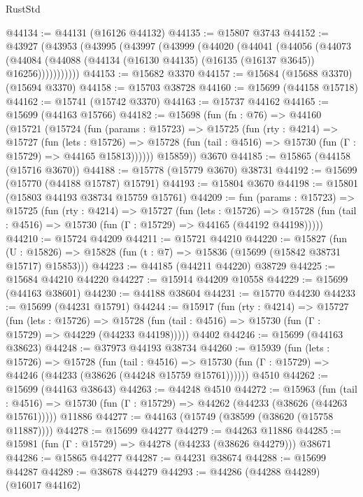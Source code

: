 \begin{lexlean}{RustStd}
\begin{coremodule}
@44134 := @44131 (@16126 @44132)
@44135 := @15807 @3743
@44152 := @43927
    (@43953
      (@43995
        (@43997
          (@43999
            (@44020
              (@44041
                (@44056
                  (@44073
                    (@44084
                      (@44088 (@44134 (@16130 @44135) (@16135 (@16137 @3645)) @16256)))))))))))
@44153 := @15682 @3370
@44157 := @15684 (@15688 @3370) (@15694 @3370)
@44158 := @15703 @38728
@44160 := @15699 (@44158 @15718)
@44162 := @15741 (@15742 @3370)
@44163 := @15737 @44162
@44165 := @15699 (@44163 @15766)
@44182 := @15698
    (fun (fn : @76) =>
    @44160
      (@15721
        (@15724
          (fun (params : @15723) =>
          @15725
            (fun (rty : @4214) =>
            @15727
              (fun (lets : @15726) =>
              @15728 (fun (tail : @4516) => @15730 (fun (Γ : @15729) => @44165 @15813))))))
        @15859))
    @3670
@44185 := @15865 (@44158 (@15716 @3670))
@44188 := @15778 (@15779 @3670) @38731
@44192 := @15699 (@15770 (@44188 @15787) @15791)
@44193 := @15804 @3670
@44198 := @15801 (@15803 @44193 @38734 @15759 @15761)
@44209 := fun (params : @15723) =>
  @15725
    (fun (rty : @4214) =>
    @15727
      (fun (lets : @15726) =>
      @15728 (fun (tail : @4516) => @15730 (fun (Γ : @15729) => @44165 (@44192 @44198)))))
@44210 := @15724 @44209
@44211 := @15721 @44210
@44220 := @15827
    (fun (U : @15826) => @15828 (fun (t : @7) => @15836 (@15699 (@15842 @38731 @15717) @15853)))
@44223 := @44185 (@44211 @44220) @38729
@44225 := @15684 @44210 @44220
@44227 := @15914 @44209 @10558
@44229 := @15699 (@44163 @38601)
@44230 := @44188 @38604
@44231 := @15770 @44230
@44233 := @15699 (@44231 @15791)
@44244 := @15917
    (fun (rty : @4214) =>
    @15727
      (fun (lets : @15726) =>
      @15728 (fun (tail : @4516) => @15730 (fun (Γ : @15729) => @44229 (@44233 @44198)))))
    @4402
@44246 := @15699 (@44163 @38623)
@44248 := @37973 @44193 @38734
@44260 := @15939
    (fun (lets : @15726) =>
    @15728
      (fun (tail : @4516) =>
      @15730 (fun (Γ : @15729) => @44246 (@44233 (@38626 (@44248 @15759 @15761))))))
    @4510
@44262 := @15699 (@44163 @38643)
@44263 := @44248 @4510
@44272 := @15963
    (fun (tail : @4516) => @15730 (fun (Γ : @15729) => @44262 (@44233 (@38626 (@44263 @15761)))))
    @11886
@44277 := @44163 (@15749 (@38599 (@38620 (@15758 @11887))))
@44278 := @15699 @44277
@44279 := @44263 @11886
@44285 := @15981 (fun (Γ : @15729) => @44278 (@44233 (@38626 @44279))) @38671
@44286 := @15865 @44277
@44287 := @44231 @38674
@44288 := @15699 @44287
@44289 := @38678 @44279
@44293 := @44286 (@44288 @44289) (@16017 @44162)

\end{coremodule}
\end{lexlean}
